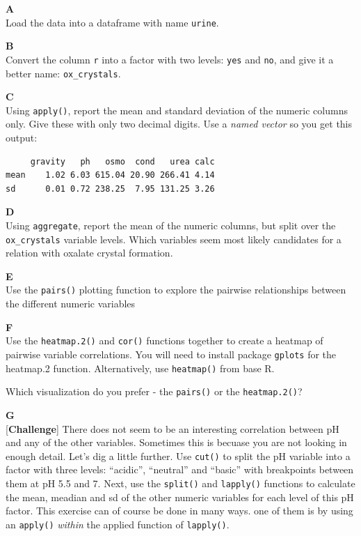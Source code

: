\documentclass[]{book}
\begin{document}
\textbf{A}\\
Load the data into a dataframe with name \texttt{urine}.

\textbf{B}\\
Convert the column \texttt{r} into a factor with two levels: \texttt{yes} and \texttt{no}, and give it a better name: \texttt{ox\_crystals}.

\textbf{C}\\
Using \texttt{apply()}, report the mean and standard deviation of the numeric columns only. Give these with only two decimal digits. Use a \emph{named vector} so you get this output:

\begin{verbatim}
     gravity   ph   osmo  cond   urea calc
mean    1.02 6.03 615.04 20.90 266.41 4.14
sd      0.01 0.72 238.25  7.95 131.25 3.26
\end{verbatim}

\textbf{D}\\
Using \texttt{aggregate}, report the mean of the numeric columns, but split over the \texttt{ox\_crystals} variable levels. Which variables seem most likely candidates for a relation with oxalate crystal formation.

\textbf{E}\\
Use the \texttt{pairs()} plotting function to explore the pairwise relationships between the different numeric variables

\textbf{F}\\
Use the \texttt{heatmap.2()} and \texttt{cor()} functions together to create a heatmap of pairwise variable correlations. You will need to install package \texttt{gplots} for the heatmap.2 function. Alternatively, use \texttt{heatmap()} from base R.

Which visualization do you prefer - the \texttt{pairs()} or the \texttt{heatmap.2()}?

\textbf{G}\\
{[}\textbf{Challenge}{]} There does not seem to be an interesting correlation between pH and any of the other variables. Sometimes this is becuase you are not looking in enough detail. Let's dig a little further. Use \texttt{cut()} to split the pH variable into a factor with three levels: ``acidic'', ``neutral'' and ``basic'' with breakpoints between them at pH 5.5 and 7. Next, use the \texttt{split()} and \texttt{lapply()} functions to calculate the mean, meadian and sd of the other numeric variables for each level of this pH factor. This exercise can of course be done in many ways. one of them is by using an \texttt{apply()} \emph{within} the applied function of \texttt{lapply()}.
\end{document}
